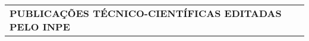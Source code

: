 
\thispagestyle{empty}
 \begin{table}
  \begin{center}
  \begin{tabularx}{\textwidth}{X}
   \textbf{PUBLICAÇÕES TÉCNICO-CIENTÍFICAS EDITADAS PELO INPE}
  \end{tabularx} 
  \end{center}
 \end{table}
  
 \begin{table}
  \begin{center}
  \begin{tabularx}{\textwidth}{X X}
      

\end{tabularx}
\end{center}
\end{table}
